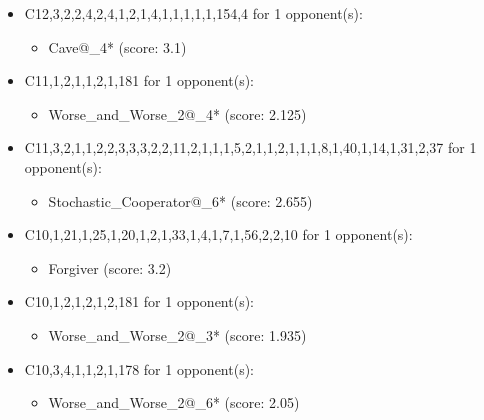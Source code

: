 \begin{appendices}
\begin{itemize}
    \item C12,3,2,2,4,2,4,1,2,1,4,1,1,1,1,1,154,4 for 1 opponent(s):
    \begin{multicols}{3}
         \begin{itemize}
            \item Cave@\_4* (score: 3.1)
        \end{itemize}
     \end{multicols}
     
    \item C11,1,2,1,1,2,1,181 for 1 opponent(s):
    \begin{multicols}{3}
         \begin{itemize}
            \item Worse\_and\_Worse\_2@\_4* (score: 2.125)
        \end{itemize}
     \end{multicols}
     
    \item C11,3,2,1,1,2,2,3,3,3,2,2,11,2,1,1,1,5,2,1,1,2,1,1,1,8,1,40,1,14,1,31,2,37 for 1 opponent(s):
    \begin{multicols}{3}
         \begin{itemize}
            \item Stochastic\_Cooperator@\_6* (score: 2.655)
        \end{itemize}
     \end{multicols}
     
    \item C10,1,21,1,25,1,20,1,2,1,33,1,4,1,7,1,56,2,2,10 for 1 opponent(s):
    \begin{multicols}{3}
         \begin{itemize}
            \item Forgiver (score: 3.2)
        \end{itemize}
     \end{multicols}
     
    \item C10,1,2,1,2,1,2,181 for 1 opponent(s):
    \begin{multicols}{3}
         \begin{itemize}
            \item Worse\_and\_Worse\_2@\_3* (score: 1.935)
        \end{itemize}
     \end{multicols}
     
    \item C10,3,4,1,1,2,1,178 for 1 opponent(s):
    \begin{multicols}{3}
         \begin{itemize}
            \item Worse\_and\_Worse\_2@\_6* (score: 2.05)
        \end{itemize}
     \end{multicols}
     

\end{itemize}
\end{appendices}
